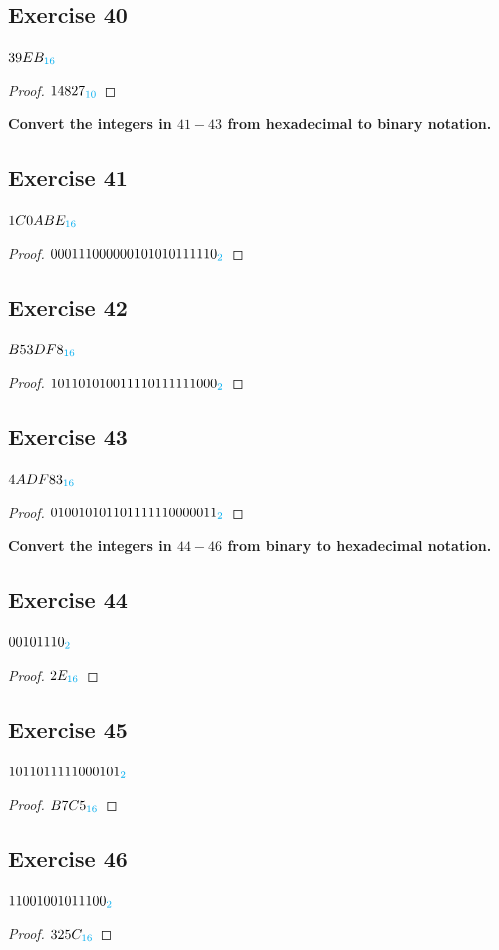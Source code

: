 \documentclass[14pt]{extarticle}
\newcommand{\base}[1]{{\color{cyan}#1}} \newcommand{\da}{\downarrow}
\begin{document}
\subsection{Exercise 40} $39EB_\base{16}$
\begin{proof} $14827_\base{10}$ \end{proof}
{\bf \color{cyan} Convert the integers in $41-43$ from hexadecimal to binary
notation.}

\subsection{Exercise 41} $1C0ABE_\base{16}$
\begin{proof} $000111000000101010111110_\base{2}$ \end{proof}
\subsection{Exercise 42} $B53DF8_\base{16}$
\begin{proof} $101101010011110111111000_\base{2}$ \end{proof}
\subsection{Exercise 43} $4ADF83_\base{16}$
\begin{proof} $010010101101111110000011_\base{2}$ \end{proof}
{\bf \color{cyan} Convert the integers in $44-46$ from binary to hexadecimal
notation.}

\subsection{Exercise 44} $00101110_\base{2}$
\begin{proof} $2E_\base{16}$ \end{proof}
\subsection{Exercise 45} $1011011111000101_\base{2}$
\begin{proof} $B7C5_\base{16}$ \end{proof}
\subsection{Exercise 46} $11001001011100_\base{2}$
\begin{proof} $325C_\base{16}$ \end{proof}
\end{document}
